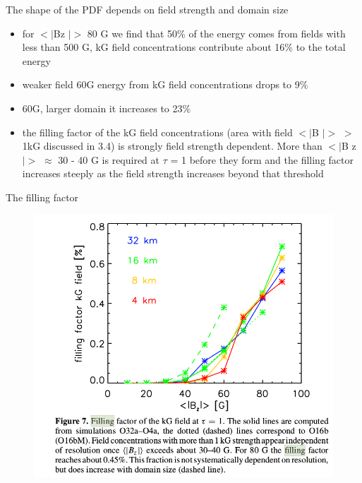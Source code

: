 \documentclass{beamer}
\begin{document}
\begin{frame}{The shape of the PDF depends on field strength and domain size }
\begin{itemize}
\item for $<\lvert$Bz $\rvert>$  80 G we find that 50\% of the energy
comes from fields with less than 500 G, kG field concentrations
contribute about 16\% to the total energy 
\item weaker field 60G  energy from kG field concentrations drops to 9\%
\item 60G, larger domain it increases to 23\%
\item the filling factor of the kG field
concentrations (area with field $<\lvert$B $\rvert>$ $>$ 1kG discussed in 3.4) is strongly field strength dependent. More than $<\lvert$B z $\rvert>$ 	 $\approx$ 30 - 40 G is required at $\tau$ = 1 before they form and the
filling factor increases steeply as the field strength increases
beyond that threshold 
\end{itemize}

\end{frame}

\begin{frame}{The filling factor}
\begin{figure}[H]
 \centering
 \includegraphics[scale=0.3]{img44-3.png}
\end{figure}

\end{frame}
\end{document}
